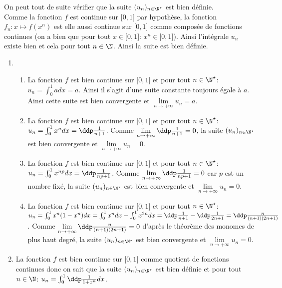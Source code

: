 \documentclass[a4paper, 11pt,reqno]{article}
\begin{document}
\begin{correction}
	On peut tout de suite v\'erifier que la suite $(u_n)_{n\in\N^{\star}}$ est bien d\'efinie.\\
	\noindent Comme la fonction $f$ est continue sur $\lbrack 0,1\rbrack$ par hypoth\`{e}se, la fonction $f_n: x\mapsto f(x^n)$ est elle aussi continue sur $\lbrack 0,1\rbrack$ comme compos\'ee de fonctions continues (on a bien que pour tout $x\in\lbrack 0,1\rbrack$: $x^n\in\lbrack 0,1\rbrack$). Ainsi l'int\'egrale $u_n$ existe bien et cela pour tout $n\in\N$. Ainsi la suite est bien d\'efinie.
	\begin{enumerate}
		\item
		      \begin{enumerate}
			      \item La fonction $f$ est bien continue sur $\lbrack 0,1\rbrack$ et pour tout $n\in\N^{\star}$: $u_n=\int_0^1 a dx=a$. Ainsi il s'agit d'une suite constante toujours \'egale \`{a} $a$. Ainsi cette suite est bien convergente et $\lim\limits_{n\to +\infty} u_n=a$.
			      \item La fonction $f$ est bien continue sur $\lbrack 0,1\rbrack$ et pour tout $n\in\N^{\star}$: $u_n=\int_0^1 x^n dx=\ddp\frac{1}{n+1}$. Comme $\lim\limits_{n\to +\infty} \ddp\frac{1}{n+1}=0$, la suite $(u_n)_{n\in\N^{\star}}$ est bien convergente et $\lim\limits_{n\to +\infty} u_n=0$.
			      \item La fonction $f$ est bien continue sur $\lbrack 0,1\rbrack$ et pour tout $n\in\N^{\star}$: $u_n=\int_0^1 x^{np} dx=\ddp\frac{1}{np+1}$. Comme $\lim\limits_{n\to +\infty} \ddp\frac{1}{np+1}=0$ car $p$ est un nombre fix\'e, la suite $(u_n)_{n\in\N^{\star}}$ est bien convergente et $\lim\limits_{n\to +\infty} u_n=0$.
			      \item La fonction $f$ est bien continue sur $\lbrack 0,1\rbrack$ et pour tout $n\in\N^{\star}$: $u_n=\int_0^1 x^n(1-x^n) dx=\int_0^1 x^n dx- \int_0^1 x^{2n} dx   =\ddp\frac{1}{n+1}-\ddp\frac{1}{2n+1}=\ddp\frac{n}{(n+1)(2n+1)}$. Comme $\lim\limits_{n\to +\infty} \ddp\frac{n}{(n+1)(2n+1)}=0$ d'apr\`{e}s le th\'eor\`{e}me des monomes de plus haut degr\'e, la suite $(u_n)_{n\in\N^{\star}}$ est bien convergente et $\lim\limits_{n\to +\infty} u_n=0$.
		      \end{enumerate}
		\item
		      La fonction $f$ est bien continue sur $\lbrack 0,1\rbrack$ comme quotient de fonctions continues donc on sait que la suite $(u_n)_{n\in\N^{\star}}$ est bien d\'efinie et pour tout $n\in\N$: $u_n=\int_0^1 \ddp\frac{1}{1+x^n}dx$.

\end{enumerate}
\end{correction}
\end{document}
